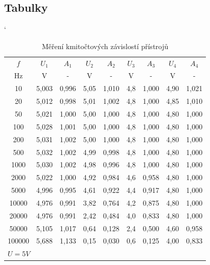 \documentclass[a4paper, czech]{article}
\begin{document}
\subsection{Tabulky}

\begin{table}[H]
    \catcode`
    \centering
    \caption{Měření kmitočtových závislostí přístrojů}
    \begin{tabular}{ccccccccc}
        \toprule
        $f$      & $U_1$    & $A_1$    & $U_2$   & $A_2$    & $U_3$  & $A_3$    & $U_4$   & $A_4$    \\
        \cmidrule(rl){1-1}
        \cmidrule(rl){2-3}
        \cmidrule(rl){4-5}
        \cmidrule(rl){6-7}
        \cmidrule(rl){8-9}
        Hz     & V     & -     & V    & -     & V   & -     & V    & -     \\
        \midrule
        10     & 5,003 & 0,996 & 5,05 & 1,010 & 4,8 & 1,000 & 4,90 & 1,021 \\
        20     & 5,012 & 0,998 & 5,01 & 1,002 & 4,8 & 1,000 & 4,85 & 1,010 \\
        50     & 5,021 & 1,000 & 5,00 & 1,000 & 4,8 & 1,000 & 4,80 & 1,000 \\
        100    & 5,028 & 1,001 & 5,00 & 1,000 & 4,8 & 1,000 & 4,80 & 1,000 \\
        200    & 5,031 & 1,002 & 5,00 & 1,000 & 4,8 & 1,000 & 4,80 & 1,000 \\
        500    & 5,032 & 1,002 & 4,99 & 0,998 & 4,8 & 1,000 & 4,80 & 1,000 \\
        1000   & 5,030 & 1,002 & 4,98 & 0,996 & 4,8 & 1,000 & 4,80 & 1,000 \\
        2000   & 5,022 & 1,000 & 4,92 & 0,984 & 4,6 & 0,958 & 4,80 & 1,000 \\
        5000   & 4,996 & 0,995 & 4,61 & 0,922 & 4,4 & 0,917 & 4,80 & 1,000 \\
        10000  & 4,976 & 0,991 & 3,82 & 0,764 & 4,2 & 0,875 & 4,80 & 1,000 \\
        20000  & 4,976 & 0,991 & 2,42 & 0,484 & 4,0 & 0,833 & 4,80 & 1,000 \\
        50000  & 5,105 & 1,017 & 0,64 & 0,128 & 2,4 & 0,500 & 4,60 & 0,958 \\
        100000 & 5,688 & 1,133 & 0,15 & 0,030 & 0,6 & 0,125 & 4,00 & 0,833 \\
        \bottomrule
        \multicolumn{9}{l}{$U = 5V$}
    \end{tabular}
\end{table}
\end{document}
